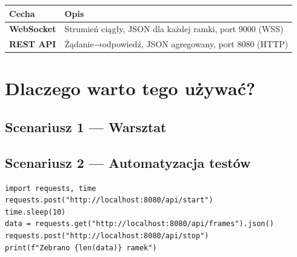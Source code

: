 \documentclass[a4paper,12pt]{article}
\begin{document}
\begin{center}
\begin{tabularx}{0.9\textwidth}{@{}>{\color{accent}\bfseries}lX@{}}
\toprule\rowcolor{darkbg} Cecha & Opis \\\midrule
WebSocket & Strumień ciągły, JSON dla każdej ramki, port 9000 (WSS) \\
REST API  & Żądanie→odpowiedź, JSON agregowany, port 8080 (HTTP) \\
\bottomrule
\end{tabularx}
\end{center}

\section{Dlaczego warto tego używać?}

\subsection{Scenariusz 1 — Warsztat}

\begin{center}
\end{center}

\subsection{Scenariusz 2 — Automatyzacja testów}

\begin{lstlisting}[style=python,caption={Automatyzacja testów w Pythonie}]
import requests, time
requests.post("http://localhost:8080/api/start")
time.sleep(10)
data = requests.get("http://localhost:8080/api/frames").json()
requests.post("http://localhost:8080/api/stop")
print(f"Zebrano {len(data)} ramek")
\end{lstlisting}
\end{document}
